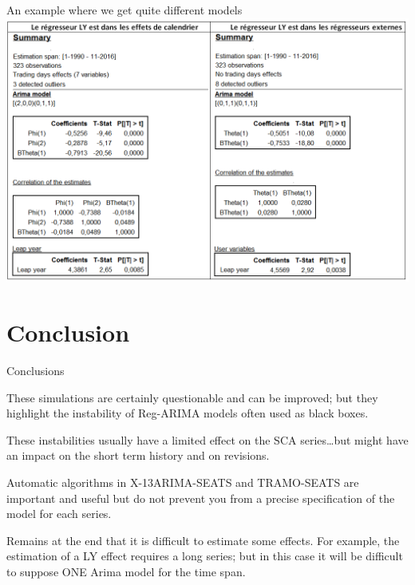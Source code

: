 \documentclass[10pt, handout]{beamer}
\begin{document}
\begin{frame}{An example where we get quite different models}
\centering
\includegraphics[width = \textwidth]{img/CholeskyRF241.png}
\end{frame}

\section{Conclusion}
\begin{frame}{Conclusions}

\bcinfo These simulations are certainly questionable and can be improved; but they highlight the instability of Reg-ARIMA models often used as black boxes.

\medskip  \pause
\bcsmbh These instabilities usually have a limited effect on the SCA series\dots \bcsmmh but might have an impact on the
short term history and on revisions.

\medskip  \pause
\bcattention Automatic algorithms in X-13ARIMA-SEATS and TRAMO-SEATS are important and  useful but do not prevent you from a precise specification of the model for each series.

\medskip  \pause
\bcattention Remains at the end that it is difficult to estimate some effects. For example, the estimation of a LY effect requires a long series; but in this case it will be difficult to suppose ONE Arima model for the time span.


\end{frame}
\end{document}
